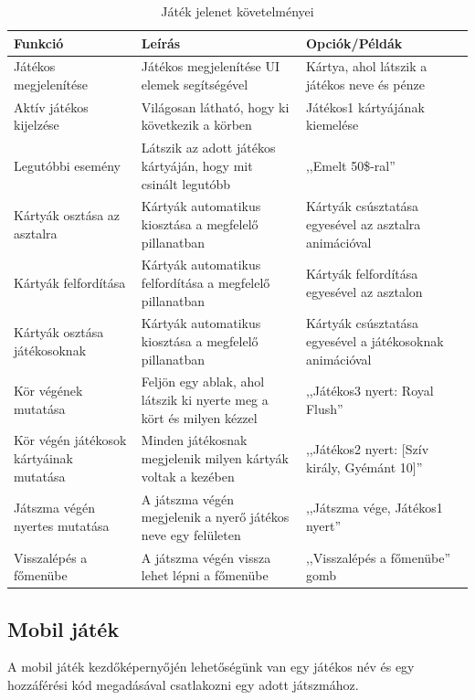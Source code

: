 \documentclass[]{thesis-ekf}
\theoremstyle{definition}
\theoremstyle{remark}
\begin{document}
\begin{table}[ht!]
	\centering
	\footnotesize
	\begin{tabular}{|p{4cm}|p{7cm}|p{4cm}|}
		\hline
		\textbf{Funkció} & \textbf{Leírás} & \textbf{Opciók/Példák} \\ 
		\hline
		Játékos megjelenítése & Játékos megjelenítése UI elemek segítségével & Kártya, ahol látszik a játékos neve és pénze \\
		\hline
		Aktív játékos kijelzése & Világosan látható, hogy ki következik a körben & Játékos1 kártyájának kiemelése \\ 
		\hline
		Legutóbbi esemény & Látszik az adott játékos kártyáján, hogy mit csinált legutóbb & ,,Emelt 50\$-ral'' \\
		\hline
		Kártyák osztása az asztalra & Kártyák automatikus kiosztása a megfelelő pillanatban & Kártyák csúsztatása egyesével az asztalra animációval \\ 
		\hline
		Kártyák felfordítása & Kártyák automatikus felfordítása a megfelelő pillanatban & Kártyák felfordítása egyesével az asztalon \\ 
		\hline
		Kártyák osztása játékosoknak & Kártyák automatikus kiosztása a megfelelő pillanatban & Kártyák csúsztatása egyesével a játékosoknak animációval \\ 
		\hline
		Kör végének mutatása & Feljön egy ablak, ahol látszik ki nyerte meg a kört és milyen kézzel & ,,Játékos3 nyert: Royal Flush'' \\
		\hline
		Kör végén játékosok kártyáinak mutatása & Minden játékosnak megjelenik milyen kártyák voltak a kezében & ,,Játékos2 nyert: [Szív király, Gyémánt 10]'' \\
		\hline
		Játszma végén nyertes mutatása & A játszma végén megjelenik a nyerő játékos neve egy felületen & ,,Játszma vége, Játékos1 nyert'' \\
		\hline
		Visszalépés a főmenübe & A játszma végén vissza lehet lépni a főmenübe & ,,Visszalépés a főmenübe'' gomb \\
		\hline
	\end{tabular}
	\caption{Játék jelenet követelményei}
\end{table}


\subsection{Mobil játék}

A mobil játék kezdőképernyőjén lehetőségünk van egy játékos név és egy hozzáférési kód megadásával csatlakozni egy adott játszmához.
\end{document}
